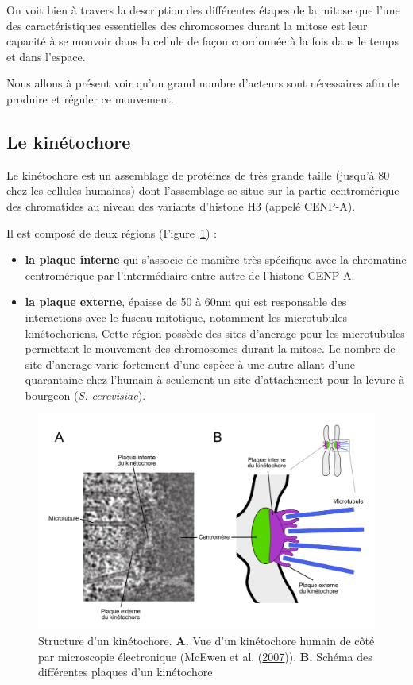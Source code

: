 \documentclass[12pt,a4paper,twoside,openright]{book}
\begin{document}
On voit bien à travers la description des différentes étapes de la
mitose que l'une des caractéristiques essentielles des chromosomes
durant la mitose est leur capacité à se mouvoir dans la cellule de façon
coordonnée à la fois dans le temps et dans l'espace.

Nous allons à présent voir qu'un grand nombre d'acteurs sont nécessaires
afin de produire et réguler ce mouvement.

\subsection{Le kinétochore}\label{le-kinuxe9tochore}

Le kinétochore est un assemblage de protéines de très grande taille
(jusqu'à 80 chez les cellules humaines) dont l'assemblage se situe sur
la partie centromérique des chromatides au niveau des variants d'histone
H3 (appelé CENP-A).

Il est composé de deux régions (Figure~\ref{fig:kt}) :

\begin{itemize}
\item
  \textbf{la plaque interne} qui s'associe de manière très spécifique
  avec la chromatine centromérique par l'intermédiaire entre autre de
  l'histone CENP-A.
\item
  \textbf{la plaque externe}, épaisse de 50 à 60nm qui est responsable
  des interactions avec le fuseau mitotique, notamment les microtubules
  kinétochoriens. Cette région possède des sites d'ancrage pour les
  microtubules permettant le mouvement des chromosomes durant la mitose.
  Le nombre de site d'ancrage varie fortement d'une espèce à une autre
  allant d'une quarantaine chez l'humain à seulement un site
  d'attachement pour la levure à bourgeon (\emph{S. cerevisiae}).
\end{itemize}

\begin{figure}[htbp]
\centering
\includegraphics{figures/intro/kt.png}
\caption{\label{fig:kt}Structure d'un kinétochore. \textbf{A.} Vue d'un
kinétochore humain de côté par microscopie électronique (McEwen et al.
(\protect\hyperlink{ref-McEwen2007}{2007})). \textbf{B.} Schéma des
différentes plaques d'un kinétochore}
\end{figure}
\end{document}
